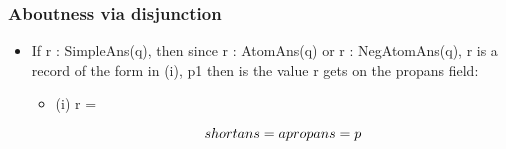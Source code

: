 \documentclass{beamer}
\newcommand{\ba}{\begin{avm}}
\newcommand{\ea}{\end{avm}}
\newcommand{\bit}{\begin{itemize}}
\newcommand{\eit}{\end{itemize}}
\begin{document}
\begin{frame}\frametitle{   Aboutness via disjunction    }
\bit
\item If r : SimpleAns(q), then since r : AtomAns(q) or r :
  NegAtomAns(q), r is a record of the form
  in (i), p1 then is the value r gets on the propans field:

\bit
\item[(i)] r = \ba\[shortans = a\\propans = p
\]\ea
\eit

\eit
\end{frame}
\end{document}
